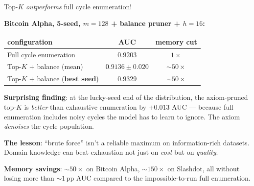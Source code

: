 \documentclass[10pt,aspectratio=169]{beamer}
\begin{document}
\begin{frame}{Top-$K$ \emph{outperforms} full cycle enumeration!}

\textbf{Bitcoin Alpha, 5-seed, $m{=}128$ + balance pruner + $h{=}16$:}

\begin{center}
\begin{tabular}{l c c}
\toprule
configuration               & AUC                 & memory cut \\
\midrule
Full cycle enumeration      & $0.9203$            & $1\times$ \\
Top-$K$ + balance (mean)    & $0.9136 \pm 0.020$  & $\sim 50\times$ \\
Top-$K$ + balance (\textbf{best seed}) & $\mathbf{0.9329}$  & $\sim 50\times$ \\
\bottomrule
\end{tabular}
\end{center}

\medskip

\textbf{Surprising finding}: at the lucky-seed end of the
distribution, the axiom-pruned top-$K$ is \emph{better} than
exhaustive enumeration by $+0.013$ AUC --- because full enumeration
includes noisy cycles the model has to learn to ignore. The axiom
\emph{denoises} the cycle population.

\medskip

\textbf{The lesson}: ``brute force'' isn't a reliable maximum on
information-rich datasets. Domain knowledge can beat exhaustion
not just on \emph{cost} but on \emph{quality}.

\medskip
\textbf{Memory savings}: $\sim 50\times$ on Bitcoin Alpha,
$\sim 150\times$ on Slashdot, all without losing more than $\sim 1$\,pp
AUC compared to the impossible-to-run full enumeration.

\end{frame}
\end{document}
